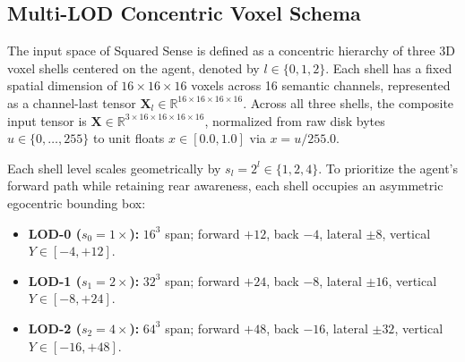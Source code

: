 \documentclass{svproc}
\begin{document}
\subsection{Multi-LOD Concentric Voxel Schema}
The input space of Squared Sense is defined as a concentric hierarchy of three 3D voxel shells centered on the agent, denoted by $l \in \{0, 1, 2\}$. Each shell has a fixed spatial dimension of $16 \times 16 \times 16$ voxels across 16 semantic channels, represented as a channel-last tensor $\mathbf{X}_l \in \mathbb{R}^{16 \times 16 \times 16 \times 16}$. Across all three shells, the composite input tensor is $\mathbf{X} \in \mathbb{R}^{3 \times 16 \times 16 \times 16 \times 16}$, normalized from raw disk bytes $u \in \{0, \dots, 255\}$ to unit floats $x \in [0.0, 1.0]$ via $x = u / 255.0$.

Each shell level scales geometrically by $s_l = 2^l \in \{1, 2, 4\}$. To prioritize the agent's forward path while retaining rear awareness, each shell occupies an asymmetric egocentric bounding box:
\begin{itemize}
    \item \textbf{LOD-0 ($s_0 = 1\times$):} $16^3$ span; forward $+12$, back $-4$, lateral $\pm 8$, vertical $Y \in [-4, +12]$.
    \item \textbf{LOD-1 ($s_1 = 2\times$):} $32^3$ span; forward $+24$, back $-8$, lateral $\pm 16$, vertical $Y \in [-8, +24]$.
    \item \textbf{LOD-2 ($s_2 = 4\times$):} $64^3$ span; forward $+48$, back $-16$, lateral $\pm 32$, vertical $Y \in [-16, +48]$.
\end{itemize}
\end{document}
